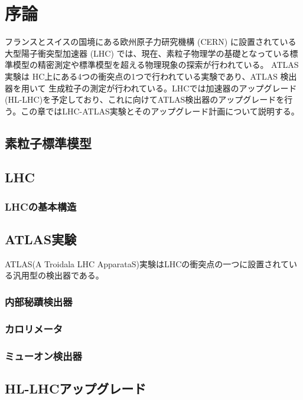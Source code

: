 \chapter{序論}

フランスとスイスの国境にある欧州原子力研究機構 (CERN) に設置されている大型陽子衝突型加速器 (LHC) では、現在、素粒子物理学の基礎となっている標準模型の精密測定や標準模型を超える物理現象の探索が行われている。 ATLAS実験は HC上にある4つの衝突点の1つで行われている実験であり、ATLAS 検出器を用いて 生成粒子の測定が行われている。LHCでは加速器のアップグレード(HL-LHC)を予定しており、これに向けてATLAS検出器のアップグレードを行う。この章ではLHC-ATLAS実験とそのアップグレード計画について説明する。


\section{素粒子標準模型}






\section{LHC}

\subsection{LHCの基本構造}






\section{ATLAS実験}

ATLAS(A Troidala LHC ApparataS)実験はLHCの衝突点の一つに設置されている汎用型の検出器である。



\subsection{内部秘蹟検出器}

\subsection{カロリメータ}

\subsection{ミューオン検出器}









\section{HL-LHCアップグレード}



\newpage
